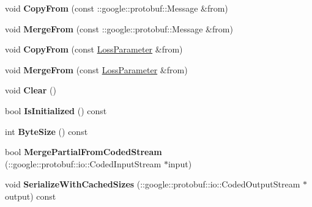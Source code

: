 \begin{DoxyCompactItemize}
\item 
\mbox{\label{classcaffe_1_1_loss_parameter_a32675bad91c328c24b302d3176a1c2c0}} 
void {\bfseries Copy\+From} (const \+::google\+::protobuf\+::\+Message \&from)
\item 
\mbox{\label{classcaffe_1_1_loss_parameter_a428590d6b4a905648fab3ed3d8d4f7da}} 
void {\bfseries Merge\+From} (const \+::google\+::protobuf\+::\+Message \&from)
\item 
\mbox{\label{classcaffe_1_1_loss_parameter_ad6157cd303c8e5d54cc0db85c1d80a1d}} 
void {\bfseries Copy\+From} (const \mbox{\hyperlink{classcaffe_1_1_loss_parameter}{Loss\+Parameter}} \&from)
\item 
\mbox{\label{classcaffe_1_1_loss_parameter_a6652ae24e90ba5d58dfc7accb833df5c}} 
void {\bfseries Merge\+From} (const \mbox{\hyperlink{classcaffe_1_1_loss_parameter}{Loss\+Parameter}} \&from)
\item 
\mbox{\label{classcaffe_1_1_loss_parameter_abaa5d5454ed43ea0c8c383d095e86e5b}} 
void {\bfseries Clear} ()
\item 
\mbox{\label{classcaffe_1_1_loss_parameter_a0f371119a37e3be2955fecfec83aa252}} 
bool {\bfseries Is\+Initialized} () const
\item 
\mbox{\label{classcaffe_1_1_loss_parameter_ac65084a0e328225bd73a05d40530452f}} 
int {\bfseries Byte\+Size} () const
\item 
\mbox{\label{classcaffe_1_1_loss_parameter_ad67d52aa90c216430e74bc467a5a73c1}} 
bool {\bfseries Merge\+Partial\+From\+Coded\+Stream} (\+::google\+::protobuf\+::io\+::\+Coded\+Input\+Stream $\ast$input)
\item 
\mbox{\label{classcaffe_1_1_loss_parameter_a9aeb2b839eac5e1de6510d5a48b206a7}} 
void {\bfseries Serialize\+With\+Cached\+Sizes} (\+::google\+::protobuf\+::io\+::\+Coded\+Output\+Stream $\ast$output) const
\item 

\end{DoxyCompactItemize}
